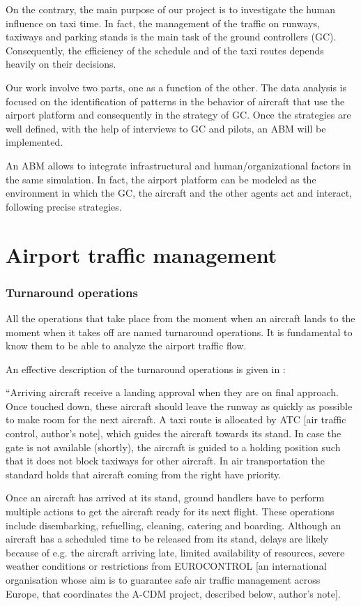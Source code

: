 \documentclass{article}
\begin{document}
On the contrary, the main purpose of our project is to investigate the human influence on taxi time.
In fact, the management of the traffic on runways, taxiways and parking stands is the main task of the ground controllers (GC). Consequently, the efficiency of the schedule and of the taxi routes depends heavily on their decisions.

Our work involve two parts, one as a function of the other. The data analysis is focused on the identification of patterns in the behavior of aircraft that use the airport platform and consequently in the strategy of GC. Once the strategies are well defined, with the help of interviews to GC and pilots, an ABM will be implemented. 

An ABM allows to integrate infrastructural and human/organizational factors in the same simulation. In fact, the airport platform can be modeled as the environment in which the GC, the aircraft and the other agents act and interact, following precise strategies.

\part{Airport traffic management}

\section{Turnaround operations}
All the operations that take place from the moment when an aircraft lands to the moment when it takes off are named turnaround operations. It is fundamental to know them to be able to analyze the airport traffic flow. 

An effective description of the turnaround operations is given in \cite{noortman}:

``Arriving aircraft receive a landing approval when they are on final approach. Once touched down, these aircraft should leave the runway as quickly as possible to make room for the next aircraft. A taxi route is allocated by ATC [air traffic control, author's note], which guides the aircraft towards its stand. In case the gate is not available (shortly), the aircraft is guided to a holding position such that it does not block taxiways for other aircraft. In air transportation the standard holds that aircraft coming from the right have priority.

Once an aircraft has arrived at its stand, ground handlers have to perform multiple actions to get the aircraft ready for its next flight. These operations include disembarking, refuelling, cleaning, catering and boarding. Although an aircraft has a scheduled time to be released from its stand, delays are likely because of e.g. the aircraft arriving late, limited availability of resources, severe weather conditions or restrictions from EUROCONTROL [an international organisation whose aim is to guarantee safe air traffic management across Europe, that coordinates the A-CDM project, described below, author's note].
\end{document}
